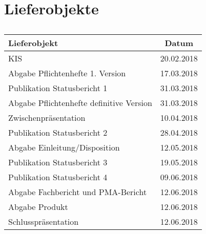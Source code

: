 \section*{Lieferobjekte}
\begin{table}[h]
	\centering
	\begin{tabular}{l|c|l}
		\toprule 
		\textbf{Lieferobjekt} & \multicolumn{2}{c}{\textbf{Datum}} \\ 
		\hline 
		KIS & \multicolumn{2}{l}{20.02.2018} \\
		\hline 
		Abgabe Pflichtenhefte 1. Version & \multicolumn{2}{l}{17.03.2018} \\
		\hline 
		Publikation Statusbericht 1 & \multicolumn{2}{l}{31.03.2018} \\
		\hline 
		Abgabe Pflichtenhefte definitive Version & \multicolumn{2}{l}{31.03.2018} \\ 
		\hline 
		Zwischenpräsentation & \multicolumn{2}{l}{10.04.2018} \\
		\hline 
		Publikation Statusbericht 2 & \multicolumn{2}{l}{28.04.2018} \\
		\hline 
		Abgabe Einleitung/Disposition & \multicolumn{2}{l}{12.05.2018} \\
		\hline 
		Publikation Statusbericht 3 & \multicolumn{2}{l}{19.05.2018} \\
		\hline 
		Publikation Statusbericht 4 & \multicolumn{2}{l}{09.06.2018} \\
		\hline 
		Abgabe Fachbericht und PMA-Bericht & \multicolumn{2}{l}{12.06.2018} \\
		\hline 
		Abgabe Produkt & \multicolumn{2}{l}{12.06.2018} \\
		\hline 
		Schlusspräsentation & \multicolumn{2}{l}{12.06.2018} \\
		\bottomrule 
	\end{tabular}
	\caption{}
	\label{tab:lieferobjekte}
\end{table}	
